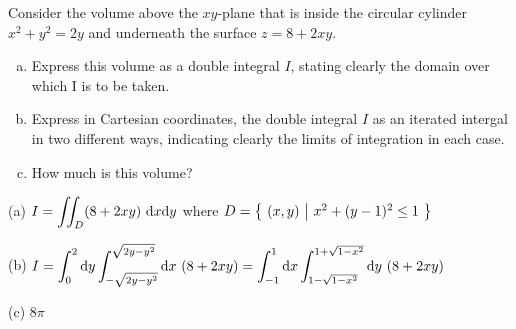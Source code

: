\begin{question}[M200 2002A] %
Consider the volume above the $xy$-plane that is inside
the circular cylinder $x^2+y^2=2y$ and underneath the surface $z=8+2xy$.
\begin{enumerate}[(a)]
\item
 Express this volume as a double integral $I$, stating clearly
the domain over which I is to be taken.

\item 
Express in Cartesian coordinates, the double integral $I$
as an iterated intergal in two different ways, indicating clearly the limits
of integration in each case.

\item
How much is this volume?
\end{enumerate}
\end{question}


\begin{answer}
(a) $\dst I=\dblInt_D (8+2xy)\ \dee{x}\dee{y}$ where 
    $D=\big\{ \ (x,y)\ \big|\ x^2+(y-1)^2\le 1\ \big\}$

(b) $\dst I
  =\int_0^2 \dee{y}\int_{-\sqrt{2y-y^2}}^{\sqrt{2y-y^2}}\dee{x}\ (8+2xy) 
  =\int_{-1}^1 \dee{x}\int_{1-\sqrt{1-x^2}}^{1+\sqrt{1-x^2}}\dee{y}\ (8+2xy)$

(c) $8\pi$
\end{answer}

